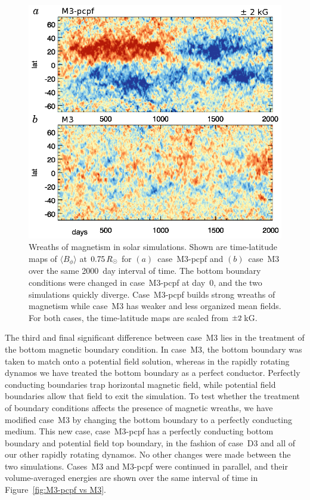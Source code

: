 \begin{figure}
  \includegraphics[width=\linewidth]{figs/chapter_8/M3_pcpf_vs_M3_time_lat.eps}
  \caption[Wreaths of magnetism in solar simulations]
          {Wreaths of magnetism in solar simulations.  
            Shown are time-latitude maps of $\langle B_\phi \rangle$
            at $0.75\thinspace R_\odot$ for 
  $(a)$~case~M3-pcpf and  $(b)$~case~M3 over the same 2000~day
  interval of time.  The bottom boundary conditions were changed in
  case~M3-pcpf at day~0, and the two simulations quickly diverge.
  Case~M3-pcpf builds strong wreaths of magnetism while case~M3 has
  weaker and less organized mean fields.  For both cases, the
  time-latitude maps are scaled from $\pm2\thinspace$kG.
  \label{fig:M3_pcpf_vs_M3}}
\end{figure}

The third and final
significant difference between case~M3 lies in the treatment of the
bottom magnetic boundary condition.  In case~M3, the bottom boundary
was taken to match onto a potential field solution, whereas in the
rapidly rotating dynamos we have treated the bottom boundary as a
perfect conductor.  Perfectly conducting boundaries trap horizontal
magnetic field, while potential field boundaries allow that field to
exit the simulation.  To test whether the treatment of boundary
conditions affects the presence of magnetic wreaths, we have
modified case~M3 by changing the bottom boundary to a perfectly
conducting medium.  This new case, case~M3-pcpf has a perfectly
conducting bottom boundary and potential field top boundary, in the
fashion of case~D3 and all of our other rapidly rotating dynamos.
No other changes were made between the two simulations.
Cases~M3 and M3-pcpf were continued in parallel, and their
volume-averaged energies are shown over the same interval of time in
Figure~\ref{fig:M3-pcpf vs M3}. 





